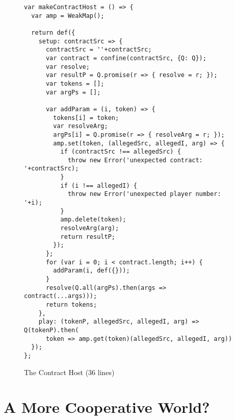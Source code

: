 \documentclass{llncs}
\begin{document}
\begin{figure}[htbp]
\begin{center}
\begin{verbatim}
var makeContractHost = () => {
  var amp = WeakMap();

  return def({
    setup: contractSrc => {
      contractSrc = ''+contractSrc;
      var contract = confine(contractSrc, {Q: Q});
      var resolve;
      var resultP = Q.promise(r => { resolve = r; });
      var tokens = [];
      var argPs = [];

      var addParam = (i, token) => {
        tokens[i] = token;
        var resolveArg;
        argPs[i] = Q.promise(r => { resolveArg = r; });
        amp.set(token, (allegedSrc, allegedI, arg) => {
          if (contractSrc !== allegedSrc) {
            throw new Error('unexpected contract: '+contractSrc);
          }
          if (i !== allegedI) {
            throw new Error('unexpected player number: '+i);
          }
          amp.delete(token);
          resolveArg(arg);
          return resultP;
        });
      };
      for (var i = 0; i < contract.length; i++) {
        addParam(i, def({}));
      }
      resolve(Q.all(argPs).then(args => contract(...args)));
      return tokens;
    },
    play: (tokenP, allegedSrc, allegedI, arg) => Q(tokenP).then(
      token => amp.get(token)(allegedSrc, allegedI, arg))
  });
};
\end{verbatim}
\caption{The Contract Host (36 lines)}
\label{makeContractHost}
\end{center}
\end{figure}

\section{A More Cooperative World?}


% 

\end{document}
